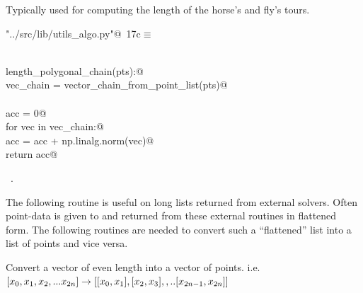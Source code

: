 \documentclass[11.5pt]{report}
\begin{document}
Typically used for computing the length of the horse's and fly's tours. 

\begin{flushleft} \small\label{scrap12}\raggedright\small
{} \verb@"../src/lib/utils_algo.py"@\nobreak\ {\footnotesize {17c}}$\equiv$
\vspace{-1ex}
\begin{list}{}{} \item
\mbox{}\verb@@\\
\mbox{}\verb@def length_polygonal_chain(pts):@\\
\mbox{}\verb@    vec_chain = vector_chain_from_point_list(pts)@\\
\mbox{}\verb@@\\
\mbox{}\verb@    acc = 0@\\
\mbox{}\verb@    for vec in vec_chain:@\\
\mbox{}\verb@        acc = acc + np.linalg.norm(vec)@\\
\mbox{}\verb@    return acc@\\
\mbox{}\verb@@{\NWsep}
\end{list}
\vspace{-1.5ex}
\footnotesize
\begin{list}{}{\setlength{\itemsep}{-\parsep}\setlength{\itemindent}{-\leftmargin}}
\item \NWtxtFileDefBy\ .

\item{}
\end{list}
\vspace{4ex}
\end{flushleft}
\newchunk The following routine is useful on long lists returned from external solvers. 
Often point-data is given to and returned from these external routines in flattened
form. The following routines are needed to convert such a ``flattened'' list into 
a list of points and vice versa. 

Convert a vector of even length into a vector of points. i.e. 
$[x_0,x_1,x_2,...x_{2n}] \rightarrow [[x_0,x_1],[x_2,x_3],,..[x_{2n-1},x_{2n}]]$
\end{document}
